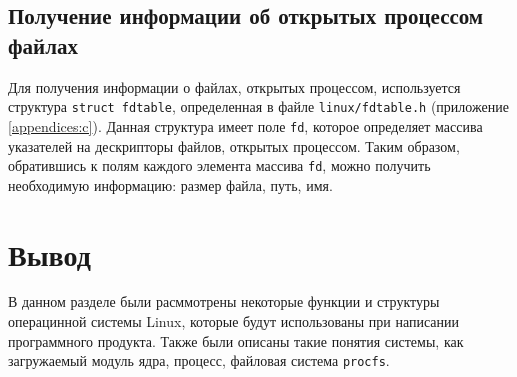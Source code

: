 \subsection{Получение информации об открытых процессом файлах}

Для получения информации о файлах, открытых процессом, используется структура \texttt{struct fdtable}, определенная в файле \texttt{linux/fdtable.h} \cite{fdtable} (приложение \ref{appendices:c}). Данная структура имеет поле \texttt{fd}, которое определяет массива указателей на дескрипторы файлов, открытых процессом. Таким образом, обратившись к полям каждого элемента массива \texttt{fd}, можно получить необходимую информацию: размер файла, путь, имя.


\section*{Вывод}

В данном разделе были расммотрены некоторые функции и структуры операцинной системы Linux, которые будут использованы при написании программного продукта. Также были описаны такие понятия системы, как загружаемый модуль ядра, процесс, файловая система \texttt{procfs}.
